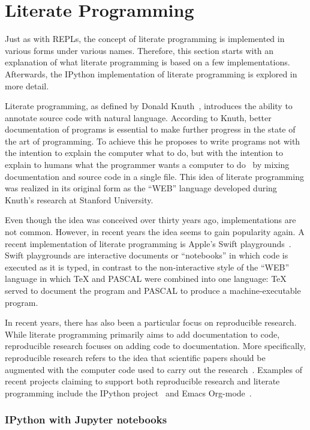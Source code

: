 \section{Literate Programming}
\label{sec:literate-programming}

Just as with REPLs, the concept of literate programming is implemented in
various forms under various names. Therefore, this section starts with an
explanation of what literate programming is based on a few implementations.
Afterwards, the IPython implementation of literate programming is explored in more
detail.

Literate programming, as defined by Donald Knuth~\cite{knuth1984}, introduces
the ability to annotate source code with natural language. According to Knuth,
better documentation of programs is essential to make further progress in the
state of the art of programming.  To achieve this he proposes to write programs
not with the intention to explain the computer what to do, but with the
intention to explain to humans what the programmer wants a computer to
do~\cite{knuth1984} by mixing documentation and source code in a single file.
This idea of literate programming was realized in its original form as the
``WEB'' language developed during Knuth's research at Stanford University.

Even though the idea was conceived over thirty years ago, implementations are not
common. However, in recent years the idea seems to gain popularity again.
A recent implementation of literate programming is Apple's Swift
playgrounds~\cite{swift-playgrounds}. Swift playgrounds are interactive
documents or ``notebooks'' in which code is executed as it is typed, in
contrast to the non-interactive style of the ``WEB'' language in which \TeX{} and
PASCAL were combined into one language: \TeX{} served to document the program
and PASCAL to produce a machine-executable program.

In recent years, there has also been a particular focus on reproducible
research. While literate programming primarily aims to add documentation to
code, reproducible research focuses on adding code to documentation. More
specifically, reproducible research refers to the idea that scientific papers
should be augmented with the computer code used to carry out the
research~\cite{schulte2012}. Examples of recent projects claiming to support
both reproducible research and literate programming include the IPython
project~\cite{ipython2007} and Emacs Org-mode~\cite{schulte2012}.

\subsubsection{IPython with Jupyter notebooks}

